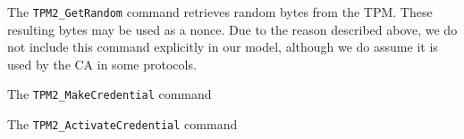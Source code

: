The \verb|TPM2_GetRandom| command retrieves random bytes from the TPM. These resulting bytes may be used as a nonce. Due to the reason described above, we do not include this command explicitly in our model, although we do assume it is used by the CA in some protocols. 




The \verb|TPM2_MakeCredential| command

The \verb|TPM2_ActivateCredential| command


%



